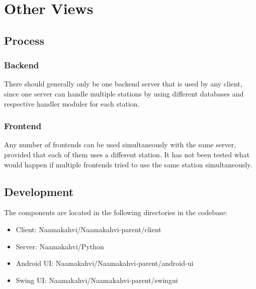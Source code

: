 \documentclass[11pt]{article}
\begin{document}
\section{Other Views}


\subsection{Process}
\subsubsection*{Backend}
There should generally only be one backend server that is used by any
client, since one server can handle multiple stations by using
different databases and respective handler moduler for each station.

\subsubsection*{Frontend}
Any number of frontends can be used simultaneously with the same
server, provided that each of them uses a different station. It has
not been tested what would happen if multiple frontends tried to use the
same station simultaneously.

\subsection{Development}

The components are located in the following directories in the codebase:
\begin{itemize}
\item Client: Naamakahvi/Naamakahvi-parent/client

\item Server: Naamakahvi/Python

\item Android UI: Naamakahvi/Naamakahvi-parent/android-ui

\item Swing UI: Naamakahvi/Naamakahvi-parent/swingui
\end{itemize}
\end{document}
